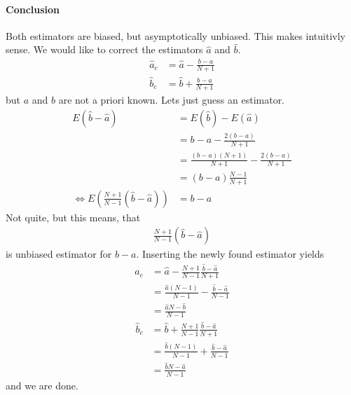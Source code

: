 \paragraph{Conclusion} Both estimators are biased, but asymptotically unbiased. This makes intuitivly sense.
We would like to correct the estimators $\hat{a}$ and $\hat{b}$.
\begin{align}
    \hat{a}_c &= \hat{a}-\frac{b-a}{N+1}
    \\\hat{b}_c &= \hat{b}+\frac{b-a}{N+1}
\end{align}
but $a$ and $b$ are not a priori known.
Lets just guess an estimator.
\begin{align}
    E(\hat{b}-\hat{a})&=E(\hat{b})-E(\hat{a})
    \\&=b-a-\frac{2\left(b-a\right)}{N+1}
    \\&=\frac{\left(b-a\right)\left(N+1\right)}{N+1}-\frac{2\left(b-a\right)}{N+1}
    \\&=\left(b-a\right)\frac{N-1}{N+1}
    \\\Leftrightarrow E\left(\frac{N+1}{N-1}\left(\hat{b}-\hat{a}\right)\right)&=b-a
\end{align}
Not quite, but this means, that
\begin{align}
    \frac{N+1}{N-1}\left(\hat{b}-\hat{a}\right)
\end{align}
is unbiased estimator for $b-a$. Inserting the newly found estimator yields
\begin{align}
    \hat{a}_c &= \hat{a}-\frac{N+1}{N-1}\frac{\hat{b}-\hat{a}}{N+1}
    \\&=\frac{\hat{a}\left(N-1\right)}{N-1}-\frac{\hat{b}-\hat{a}}{N-1}
    \\&=\frac{\hat{a}N-\hat{b}}{N-1}
\end{align}
\begin{align}
    \hat{b}_c&=\hat{b}+\frac{N+1}{N-1}\frac{\hat{b}-\hat{a}}{N+1}
    \\&=\frac{\hat{b}\left(N-1\right)}{N-1}+\frac{\hat{b}-\hat{a}}{N-1}
    \\&=\frac{\hat{b}N-\hat{a}}{N-1}
\end{align}
and we are done.